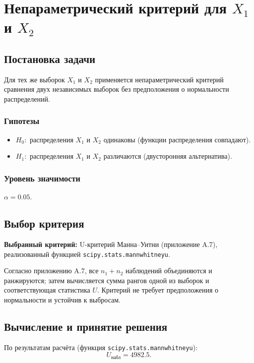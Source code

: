 \section{Непараметрический критерий для \(X_1\) и \(X_2\)}

\subsection{Постановка задачи}

Для тех же выборок \(X_1\) и \(X_2\) применяется непараметрический критерий сравнения двух независимых выборок без предположения о нормальности распределений.

\subsubsection{Гипотезы}
\begin{itemize}
    \item \(H_0:\) распределения \(X_1\) и \(X_2\) одинаковы (функции распределения совпадают).
    \item \(H_1:\) распределения \(X_1\) и \(X_2\) различаются (двусторонняя альтернатива).
\end{itemize}

\subsubsection{Уровень значимости}
\(\alpha = 0.05\).

\subsection{Выбор критерия}

\textbf{Выбранный критерий:} U-критерий Манна–Уитни (приложение A.7), реализованный функцией \texttt{scipy.stats.mannwhitneyu}.

Согласно приложению A.7, все \(n_1 + n_2\) наблюдений объединяются и ранжируются; затем вычисляется сумма рангов одной из выборок и соответствующая статистика \(U\). Критерий не требует предположения о нормальности и устойчив к выбросам.

\subsection{Вычисление и принятие решения}

По результатам расчёта (функция \texttt{scipy.stats.mannwhitneyu}):
\[
U_{\text{набл}} = 4982.5.
\]

